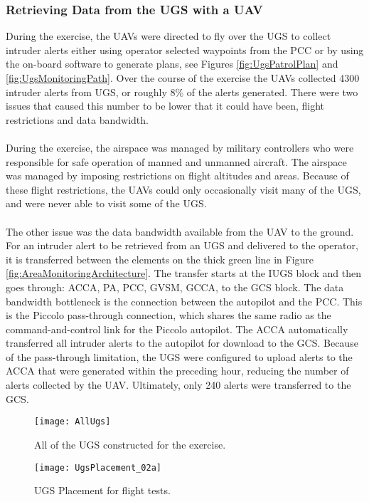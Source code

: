 \documentclass[letterpaper, 12 pt, conference]{ieeeconf}  %
\theoremstyle{definition}
\begin{document}
\subsubsection{Retrieving Data from the UGS with a UAV}
During the exercise, the UAVs were directed to fly over the UGS to collect intruder alerts either using operator selected waypoints from the PCC or by using the on-board software to generate plans, see Figures \ref{fig:UgsPatrolPlan} and \ref{fig:UgsMonitoringPath}. Over the course of the exercise the UAVs collected 4300 intruder alerts from UGS, or roughly 8\% of the alerts generated. There were two issues that caused this number to be lower that it could have been, flight restrictions and data bandwidth.\\\\
During the exercise, the airspace was managed by military controllers who were responsible for safe operation of manned and unmanned aircraft. The airspace was managed by imposing restrictions on flight altitudes and areas. Because of these flight restrictions, the UAVs could only occasionally visit many of the UGS, and were never able to visit some of the UGS.\\\\
The other issue was the data bandwidth available from the UAV to the ground. For an intruder alert to be retrieved from an UGS and delivered to the operator, it is transferred between the elements on the thick green line in Figure \ref{fig:AreaMonitoringArchitecture}. The transfer starts at the IUGS block and then goes through: ACCA, PA, PCC, GVSM, GCCA, to the GCS block. The data bandwidth bottleneck is the connection between the autopilot and the PCC. This is the Piccolo pass-through connection, which shares the same radio as the command-and-control link for the Piccolo autopilot. The ACCA automatically transferred all intruder alerts to the autopilot for download to the GCS. Because of the pass-through limitation, the UGS were configured to upload alerts to the ACCA that were generated within the preceding hour, reducing the number of alerts collected by the UAV. Ultimately, only 240 alerts were transferred to the GCS. 



\begin{figure}[htb]
\centering
      \texttt{[image: AllUgs]}
      \caption{All of the UGS constructed for the exercise.}
      \label{fig:AllUgs}
\end{figure}

\begin{figure}[htb]
\centering
      \texttt{[image: UgsPlacement\_02a]}
      \caption{UGS Placement for flight tests.}
      \label{fig:UGSPlacementForFlightTests}
\end{figure}
\end{document}
